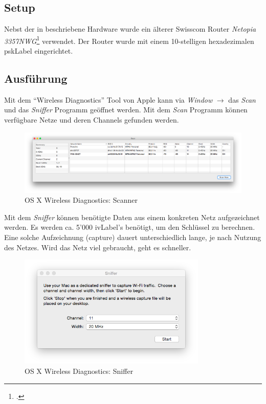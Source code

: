 \subsection{Setup}
Nebst der in  beschriebene Hardware wurde ein älterer Swisscom Router \textit{Netopia  3357NWG}\footcite{Netopia_3347_57nwg_de_2015-04-06} verwendet. Der Router wurde mit einem 10-stelligen hexadezimalen \gls{pskLabel} eingerichtet.

\subsection{Ausführung}
\label{subsec:wep_crack_tutorial}
Mit dem "`Wireless Diagnostics"' Tool von Apple kann via \textit{Window} $\rightarrow$ das \textit{Scan} und das \textit{Sniffer} Programm geöffnet werden.
Mit dem \textit{Scan} Programm können verfügbare Netze und deren Channels gefunden werden.

\begin{figure}[H]
	\centering
	\includegraphics[width=1.0\textwidth]{images/wep/scan.png}
	\caption{OS X Wireless Diagnostics: Scanner}
\end{figure}

Mit dem \textit{Sniffer} können benötigte Daten aus einem konkreten Netz aufgezeichnet werden. Es werden ca. 5'000 \gls{ivLabel}'s benötigt, um den Schlüssel zu berechnen. Eine solche Aufzeichnung (capture) dauert unterschiedlich lange, je nach Nutzung des Netzes. Wird das Netz viel gebraucht, geht es schneller.

\begin{figure}[H]
	\centering
	\includegraphics[width=0.8\textwidth]{images/wep/sniffer.png}
	\caption{OS X Wireless Diagnostics: Sniffer}
\end{figure}

